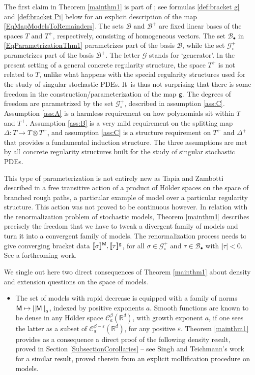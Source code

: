 \documentclass[11pt]{article}
\numberwithin{equation}{section}
\newcommand\mto{\mathchoice{\longmapsto}{\mapsto}{\mapsto}{\mapsto}}
\newcommand{\sbullet}{{\scriptscriptstyle\bullet}}
\theoremstyle{plain}
\theoremstyle{definition}
\newcommand{\Brac}[1]{[\![#1]\!]}
\let\epsilon\varepsilon
\newcommand{\bbR}{\mathbb{R}}
\newcommand{\mcB}{\mathcal{B}}
\newcommand{\mcC}{\mathcal{C}}
\newcommand{\mcG}{\mathcal{G}}
\begin{document}
The first claim in Theorem \ref{mainthm1} is part of \cite[Th.\,21]{BH}; see formulas \eqref{def:bracket g} and \eqref{def:bracket Pi} below for an explicit description of the map \eqref{EqMapModelsToRemainders}. The sets $\mcB$ and $\mcB^+$ are fixed linear bases of the spaces $T$ and $T^+$, respectively, consisting of homogeneous vectors. The set $\mcB_\sbullet$ in \eqref{EqParametrizationThm1} parametrizes part of the basis $\mcB$, while the set $\mcG_\circ^+$ parametrizes part of the basis $\mcB^+$. The letter $\mcG$ stands for `generator'. In the present setting of a general concrete regularity structure, the space $T^+$ is not related to $T$, unlike what happens with the special regularity structures used for the study of singular stochastic PDEs. It~is thus not surprising that there is some freedom in the construction/parameterization of the map $\sf g$. The degrees of freedom are parametrized by the set $\mcG^+_\circ$, described in assumption \eqref{ass:C}. Assumption \eqref{ass:A} is a harmless requirement on how polynomials sit within $T$ and $T^+$. Assumption \eqref{ass:B} is a very mild requirement on the splitting map $\Delta : T\to T\otimes T^+$, and assumption \eqref{ass:C} is a structure requirement on $T^+$ and $\Delta^+$ that provides a fundamental induction structure. The three assumptions are met by all concrete regularity structures built for the study of singular stochastic PDEs.

This type of parameterization is not entirely new as Tapia and Zambotti described in \cite{TZ18} a free transitive action of a product of Hölder spaces on the space of branched rough paths, a particular example of model over a particular regularity structure. This action was not proved to be continuous however. In relation with the renormalization problem of stochastic models, Theorem \ref{mainthm1} describes precisely the freedom that we have to tweak a divergent family of models and turn it into a convergent family of models. The renormalization process needs to give converging bracket data $\Brac{\sigma}^{\sf M}, \Brac{\tau}^{\sf g}$, for all $\sigma\in\mcG_\circ^+$ and $\tau\in\mcB_\sbullet$ with $\vert\tau\vert<0$. See a forthcoming work.

We single out here two direct consequences of Theorem \ref{mainthm1} about density and extension questions on the space of models.

\begin{itemize}
\item
The set of models with rapid decrease is equipped with a family of norms ${\sf M\mto \|M\|}_a$, indexed by positive exponents $a$. Smooth functions are known to be dense in any Hölder space $\mcC^\beta_a(\bbR^d)$, with growth exponent $a$, if one sees the latter as a subset of $\mcC^{\beta-\epsilon}_a(\bbR^d)$, for any positive $\epsilon$. Theorem \ref{mainthm1} provides as a consequence a direct proof of the following density result, proved in Section \ref{SubsectionCorollaries} -- see Singh and Teichmann's work \cite{SinghTeichmann} for a similar result, proved therein from an explicit mollification procedure on models.
\end{itemize}
\end{document}
